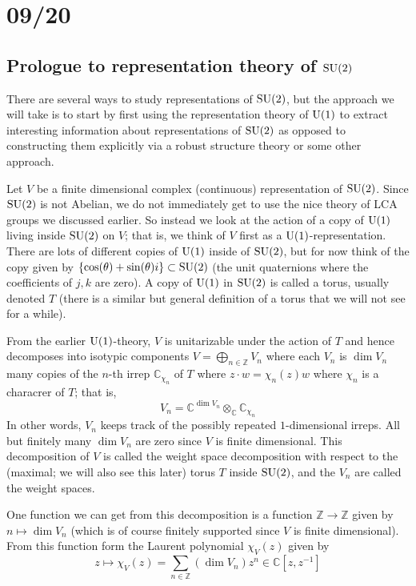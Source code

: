\documentclass[../../rtnotes.tex]{subfiles}
\begin{document}
\section{09/20}
\subsection{Prologue to representation theory of $\operatorname{SU}(2)$}
There are several ways to study representations of $\operatorname{SU}(2)$, but the approach we will take is to start by first using the representation theory of $\operatorname{U}(1)$ to extract interesting information about representations of $\operatorname{SU}(2)$ as opposed to constructing them explicitly via a robust structure theory or some other approach.

Let $V$ be a finite dimensional complex (continuous) representation of $\operatorname{SU}(2)$. Since $\operatorname{SU}(2)$ is not Abelian, we do not immediately get to use the nice theory of LCA groups we discussed earlier. So instead we look at the action of a copy of $\operatorname{U}(1)$ living inside $\operatorname{SU}(2)$ on $V$; that is, we think of $V$ first as a $\operatorname{U}(1)$-representation. There are lots of different copies of $\operatorname{U}(1)$ inside of $\operatorname{SU}(2)$, but for now think of the copy given by $\{\cos(\theta) + \sin(\theta)i\}\subset \operatorname{SU}(2)$ (the unit quaternions where the coefficients of $j,k$ are zero). A copy of $\operatorname{U}(1)$ in $\operatorname{SU}(2)$ is called a torus, usually denoted $T$ (there is a similar but general definition of a torus that we will not see for a while).

From the earlier $\operatorname{U}(1)$-theory, $V$ is unitarizable under the action of $T$ and hence decomposes into isotypic components $V = \bigoplus_{n\in\mathbb Z}V_n$ where each $V_n$ is $\dim V_n$ many copies of the $n$-th irrep $\mathbb C_{\chi_n}$ of $T$ where $z\cdot w = \chi_n(z)w$ where $\chi_n$ is a characrer of $T$; that is,
\[V_n = \mathbb C^{\dim V_n}\otimes_{\mathbb C}\mathbb C_{\chi_n}\]
In other words, $V_n$ keeps track of the possibly repeated $1$-dimensional irreps. All but finitely many $\dim V_n$ are zero since $V$ is finite dimensional. This decomposition of $V$ is called the weight space decomposition with respect to the (maximal; we will also see this later) torus $T$ inside $\operatorname{SU}(2)$, and the $V_n$ are called the weight spaces.

One function we can get from this decomposition is a function $\mathbb Z\to\mathbb Z$ given by $n\mapsto \dim V_n$ (which is of course finitely supported since $V$ is finite dimensional). From this function form the Laurent polynomial $\chi_V(z)$ given by
\[z\mapsto \chi_V(z) = \sum_{n\in \mathbb Z}(\dim V_n)z^n\in\mathbb C[z,z^{-1}]\]
\end{document}
